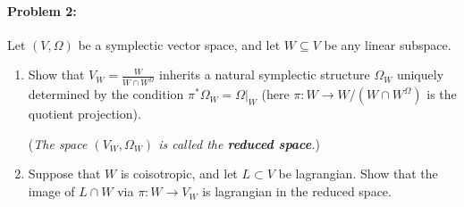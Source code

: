 \paragraph{Problem 2:} Let $(V,\Omega)$ be a symplectic vector space, and let $W\subseteq V$ be any linear subspace.
\begin{enumerate}[label=\alph*.]
	\item Show that $V_{W}=\frac{W}{W\cap W^{\Omega}}$ inherits a natural symplectic structure $\Omega_{W}$ uniquely determined by the condition $\pi^{*} \Omega_{W}=\Omega|_{W}$ (here $\pi:W\to W/(W\cap W^{\Omega}) $ is the quotient projection).
	
		(\textit{The space $(V_{W},\Omega_{W})$ is called the \textbf{reduced space}.})

	\item Suppose that $W$ is coisotropic, and let $L\subset V$ be lagrangian. Show that the image of $L\cap W$ via $\pi:W\to V_{W}$ is lagrangian in the reduced space.
\end{enumerate}

